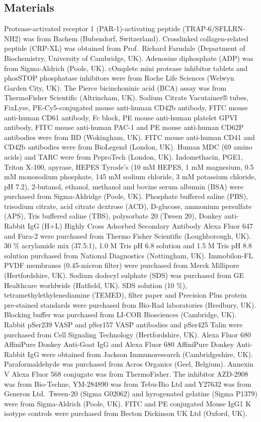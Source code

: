 \documentclass[11pt,twoside]{bristolthesis}
\begin{document}
\hypertarget{materials}{%
\subsection{Materials}\label{materials}}

Protease-activated receptor 1 (PAR-1)-activating peptide (TRAP-6/SFLLRN-NH2) was from Bachem (Bubendorf, Switzerland). Crosslinked collagen-related peptide (CRP-XL) was obtained from Prof.~Richard Farndale (Department of Biochemistry, University of Cambridge, UK). Adenosine diphosphate (ADP) was from Sigma-Aldrich (Poole, UK). cOmplete mini protease inhibitor tablets and phosSTOP phosphatase inhibitors were from Roche Life Sciences (Welwyn Garden City, UK). The Pierce bicinchoninic acid (BCA) assay was from ThermoFisher Scientific (Altrincham, UK). Sodium Citrate Vacutainer® tubes, FixLyse, PE-Cy5-conjugated mouse anti-human CD42b antibody, FITC mouse anti-human CD61 antibody, Fc block, PE mouse anti-human platelet GPVI antibody, FITC mouse anti-human PAC-1 and PE mouse anti-human CD62P antibodies were from BD (Wokingham, UK). FITC mouse anti-human CD41 and CD42b antibodies were from BioLegend (London, UK). Human MDC (69 amino acids) and TARC were from PeproTech (London, UK). Indomethacin, PGE1, Triton X-100, apyrase, HEPES Tyrode's (10 mM HEPES, 1 mM magnesium, 0.5 mM monosodium phosphate, 145 mM sodium chloride, 3 mM potassium chloride, pH 7.2), 2-butanol, ethanol, methanol and bovine serum albumin (BSA) were purchased from Sigma-Aldridge (Poole, UK). Phosphate buffered saline (PBS), trisodium citrate, acid citrate dextrose (ACD), D-glucose, ammonium persulfate (APS), Tris buffered saline (TBS), polysorbate 20 (Tween 20), Donkey anti-Rabbit IgG (H+L) Highly Cross Adsorbed Secondary Antibody Alexa Fluor 647 and Fura-2 were purchased from Thermo Fisher Scientific (Loughborough, UK). 30 \% acrylamide mix (37.5:1), 1.0 M Tris pH 6.8 solution and 1.5 M Tris pH 8.8 solution purchased from National Diagnostics (Nottingham, UK). Immobilon-FL PVDF membranes (0.45-micron filter) were purchased from Merck Millipore (Hertfordshire, UK). Sodium dodecyl sulphate (SDS) was purchased from GE Healthcare worldwide (Hatfield, UK). SDS solution (10 \%), tetramethylethylenediamine (TEMED), filter paper and Precision Plus protein pre-stained standards were purchased from Bio-Rad laboratories (Bredbury, UK). Blocking buffer was purchased from LI-COR Biosciences (Cambridge, UK). Rabbit pSer239 VASP and pSer157 VASP antibodies and pSer425 Talin were purchased from Cell Signaling Technology (Hertfordshire, UK). Alexa Fluor 680 AffiniPure Donkey Anti-Goat IgG and Alexa Fluor 680 AffiniPure Donkey Anti-Rabbit IgG were obtained from Jackson Immunoresearch (Cambridgeshire, UK). Paraformaldehyde was purchased from Acros Organics (Geel, Belgium). Annexin V Alexa Fluor 568 conjugate was from ThermoFisher. The inhibitor AZD-2908 was from Bio-Techne, YM-284890 was from Tebu-Bio Ltd and Y27632 was from Generon Ltd.~Tween-20 (Sigma G02062) and hyrogenated gelatine (Sigma P1379) were from Sigma-Aldrich (Poole, UK). FITC and PE conjugated Mouse IgG1 K isotype controls were purchased from Becton Dickinson UK Ltd (Oxford, UK).
\end{document}
